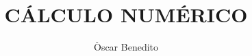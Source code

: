 \documentclass[spanish]{../notes}
\title{CÁLCULO NUMÉRICO}
\author{Òscar Benedito}\singleauthor
\begin{document}
\makecover





\printindex
\end{document}
